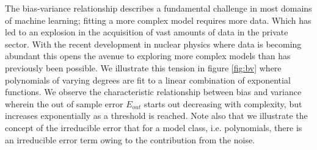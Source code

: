 The bias-variance relationship describes a fundamental challenge in most domains of machine learning; fitting a more complex model requires more data. Which has led to an explosion in the acquisition of vast amounts of data in the private sector. With the recent development in nuclear physics where data is becoming abundant this opens the avenue to exploring more complex models than has previously been possible. We illustrate this tension in figure \ref{fig:bv} where polynomials of varying degrees are fit to a linear combination of exponential functions. We observe the characteristic relationship between bias and variance wherein the out of sample error $E_{out}$ starts out decreasing with complexity, but increases exponentially as a threshold is reached. Note also that we illustrate the concept of the irreducible error that for a model class, i.e. polynomials, there is an irreducible error term owing to the contribution from the noise. 
